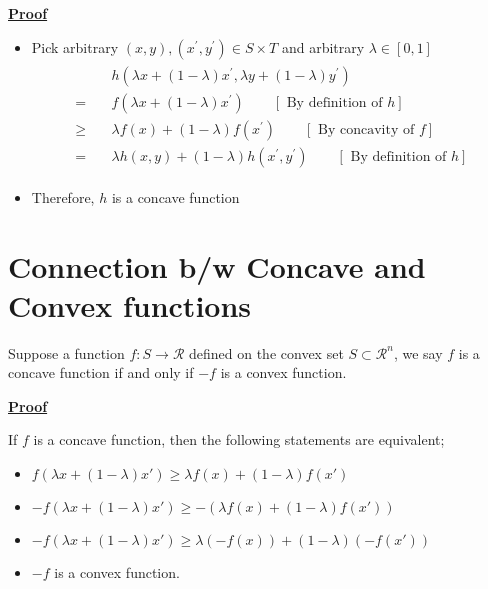 \documentclass[12pt,a4paper]{article}
\begin{document}
\underline{\textbf{Proof}}
\begin{itemize}
    \item Pick arbitrary \((x, y),\left(x^{\prime}, y^{\prime}\right) \in S \times T\) and arbitrary \(\lambda \in[0,1]\)
    \begin{align*}
    \begin{aligned}
    & h\left(\lambda x+(1-\lambda) x^{\prime}, \lambda y+(1-\lambda) y^{\prime}\right) \\
    =\quad & f\left(\lambda x+(1-\lambda) x^{\prime}\right) \qquad{[\text { By definition of } h] } \\
    \geq \quad & \lambda f(x)+(1-\lambda) f\left(x^{\prime}\right) \qquad [\text{ By concavity of  }f]\\
    = \ \ \  &\lambda h(x, y)+(1-\lambda) h\left(x^{\prime}, y^{\prime}\right) \qquad 
    [\text{ By definition of } h] 
    \end{aligned}
    \end{align*}
   \item Therefore, \(h\) is a concave function
\end{itemize}
\section{Connection b/w Concave and Convex functions}
Suppose a function \(f: S \rightarrow \mathcal{R}\) defined on the convex set \(S \subset \mathcal{R}^n\), we say \(f\) is a concave function if and only if \(-f\) is a convex function.

\underline{\textbf{Proof}}

If \(f\) is a concave function, then the following statements are equivalent; 
\begin{itemize}
    \item \(f(\lambda x + (1 -\lambda)x') \geq \lambda f(x) + (1-\lambda)f(x')\) 
    \item \(-f(\lambda x + (1 -\lambda)x') \geq -(\lambda f(x) + (1-\lambda)f(x'))\) 
    \item \(-f(\lambda x + (1 -\lambda)x') \geq \lambda (-f(x)) + (1-\lambda)(-f(x'))\)
    \item \(-f\) is a convex function.   
\end{itemize}
\end{document}

